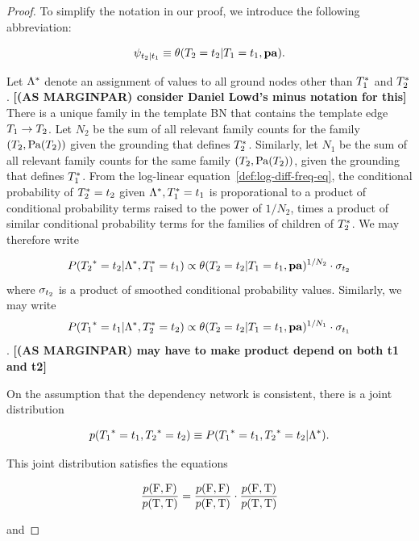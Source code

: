 \documentclass[runningheads,a4paper]{llncs}
\renewcommand{\marginpar}[1]{\fixneeded{(AS MARGINPAR) #1}}
\newcommand{\fixneeded}[1]{\textbf{[\footnotesize #1]}}
\begin{document}
\begin{proof}
To simplify the notation in our proof, we introduce the following abbreviation:

$$\psi_{t_{2}|t_{1}} \equiv \theta(T_{2} = t_{2}|T_{1} = t_{1},\mathbf{pa}).$$



Let $\Lambda^{*}\hspace{0.0ex}$ denote an assignment of values to all ground nodes other than $T_{1}^{*}\hspace{0.0ex}$ and $ T_{2}^{*}\hspace{0.0ex}$. \marginpar{consider Daniel Lowd's minus notation for this} There is a unique family in the template BN that contains the template edge $T_{1} \rightarrow T_{2}$. Let $N_{2}$ be the sum of all relevant family counts for the family $(T_{2}, \mathrm{Pa}(T_{2}))$ given the grounding that defines $ T_{2}^{*}\hspace{0.0ex}$. Similarly, let $N_{1}$ be the sum of all relevant family counts for the same family $(T_{2}, \mathrm{Pa}(T_{2}))$, given the grounding that defines $ T_{1}^{*}\hspace{0.0ex}$. From the log-linear equation~\ref{def:log-diff-freq-eq}, the conditional probability of $T_{2}^{*}\hspace{0.0ex}= t_{2}$ given $\Lambda^{*}\hspace{0.0ex}, T_{1}^{*}\hspace{0.0ex} = t_{1}$ is proporational to a product of conditional probability terms raised to the power of $1/N_{2}$, times a product of similar conditional probability terms for the families of children of $T_{2}^{*}\hspace{0.0ex}$. We may therefore write 

$$P({T_{2}}^{*}\hspace{0.0ex} = t_{2} | \Lambda^{*}\hspace{0.0ex},T_{1}^{*}\hspace{0.0ex} = t_{1}) \propto \theta(T_{2} = t_{2}|T_{1} = t_{1},\mathbf{pa})^{1/N_{2}} \cdot \sigma_{t_{2}}$$ where 
$\sigma_{t_{2}}$ is a product of smoothed conditional probability values. Similarly, we may write $$P({T_{1}}^{*}\hspace{0.0ex} = t_{1} | \Lambda^{*}\hspace{0.0ex},T_{2}^{*}\hspace{0.0ex} = t_{2}) \propto \theta(T_{2} = t_{2}|T_{1} = t_{1},\mathbf{pa})^{1/N_{1}} \cdot \sigma_{t_{1}}$$. \marginpar{may have to make product depend on both t1 and t2} 

On the assumption that the dependency network is consistent, there is a joint distribution 

$$p({T_{1}}^{*}\hspace{0.0ex} = t_{1}, {T_{2}}^{*}\hspace{0.0ex} = t_{2}) \equiv P({T_{1}}^{*}\hspace{0.0ex} = t_{1}, {T_{2}}^{*}\hspace{0.0ex} = t_{2}|\Lambda^{*}\hspace{0.0ex}).$$

This joint distribution satisfies the equations

\begin{equation*}
\frac{p(\mathrm{F},\mathrm{F})}{p(\mathrm{T},\mathrm{T})} = \frac{p(\mathrm{F},\mathrm{F})}{p(\mathrm{F},\mathrm{T})} \cdot \frac{p(\mathrm{F},\mathrm{T})}{p(\mathrm{T},\mathrm{T})}
\end{equation*}

and 


\end{proof}
\end{document}
